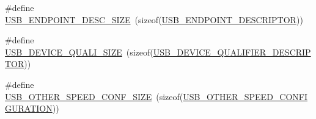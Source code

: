 \begin{DoxyCompactItemize}
$$\item 
\#define \hyperlink{group__USBD__Core_ga317f2697db907bff3f818a644d231c08}{U\-S\-B\-\_\-\-E\-N\-D\-P\-O\-I\-N\-T\-\_\-\-D\-E\-S\-C\-\_\-\-S\-I\-Z\-E}~(sizeof(\hyperlink{group__USBD__Core_ga652b2871268bd903653cbff0f3448a6e}{U\-S\-B\-\_\-\-E\-N\-D\-P\-O\-I\-N\-T\-\_\-\-D\-E\-S\-C\-R\-I\-P\-T\-O\-R}))
\item 
\#define \hyperlink{group__USBD__Core_ga038630c136094c9f727b62cb81a9a186}{U\-S\-B\-\_\-\-D\-E\-V\-I\-C\-E\-\_\-\-Q\-U\-A\-L\-I\-\_\-\-S\-I\-Z\-E}~(sizeof(\hyperlink{group__USBD__Core_ga4460a327f0c59c1d44e550efcff1eb00}{U\-S\-B\-\_\-\-D\-E\-V\-I\-C\-E\-\_\-\-Q\-U\-A\-L\-I\-F\-I\-E\-R\-\_\-\-D\-E\-S\-C\-R\-I\-P\-T\-O\-R}))
\item 
\#define \hyperlink{group__USBD__Core_gab7288d5e0e645952c8c156182f3baa11}{U\-S\-B\-\_\-\-O\-T\-H\-E\-R\-\_\-\-S\-P\-E\-E\-D\-\_\-\-C\-O\-N\-F\-\_\-\-S\-I\-Z\-E}~(sizeof(\hyperlink{group__USBD__Core_ga808d47bcf11e648d95efc88e330fabc5}{U\-S\-B\-\_\-\-O\-T\-H\-E\-R\-\_\-\-S\-P\-E\-E\-D\-\_\-\-C\-O\-N\-F\-I\-G\-U\-R\-A\-T\-I\-O\-N}))
\end{DoxyCompactItemize}
